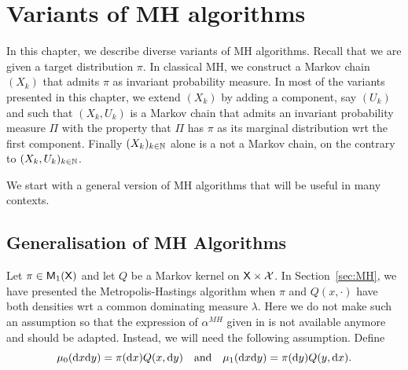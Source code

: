 \documentclass[english,graybox,envcountchap,envcountsame,sectrefs,shortlabels]{svmono}
\theoremstyle{style}
\renewenvironment{keywords}{\textit{\bf Keywords: } \sffamily }{}
\begin{document}
%

\chapter{Variants of MH algorithms}
\minitoc


In this chapter, we describe diverse variants of MH algorithms. Recall that we are given a target distribution $\pi$. In classical MH, we construct a Markov chain $(X_k)$ that admits $\pi$ as invariant probability  measure. In most of the variants presented in this chapter, we extend $(X_k)$ by adding a component, say $(U_k)$ and such that $(X_k,U_k)$ is a Markov chain that admits an invariant probability measure $\Pi$ with the property that $\Pi$ has $\pi$ as its marginal distribution wrt the first component.
Finally $(X_k)_{k\in\mathbb{N}}$ alone is a not a Markov chain, on the contrary to $(X_k,U_k)_{k\in\mathbb{N}}$.

We start with a general version of MH algorithms that will be useful in many contexts.
\section{Generalisation of MH Algorithms}
\label{sec:gener}
Let $\pi\in\mathsf{M}_{1}(\mathsf{X})$ and let $Q$ be a Markov kernel on $\mathsf{X} \times\mathcal{X}$. In Section~\ref{sec:MH}, we have presented the Metropolis-Hastings algorithm when $\pi$ and $Q(x,\cdot)$ have both densities wrt a common dominating measure $\lambda$. Here we do not make such an assumption so that the expression of $\alpha^{MH}$ given in  is not available anymore and should be adapted. Instead, we will need the following assumption. Define
$$
\mu_0(\mathrm{d} x \mathrm{d} y)=\pi(\mathrm{d} x) Q(x,\mathrm{d} y)\quad \mbox{and} \quad \mu_1(\mathrm{d} x \mathrm{d} y)=\pi(\mathrm{d} y) Q(y,\mathrm{d} x).
$$
\end{document}
